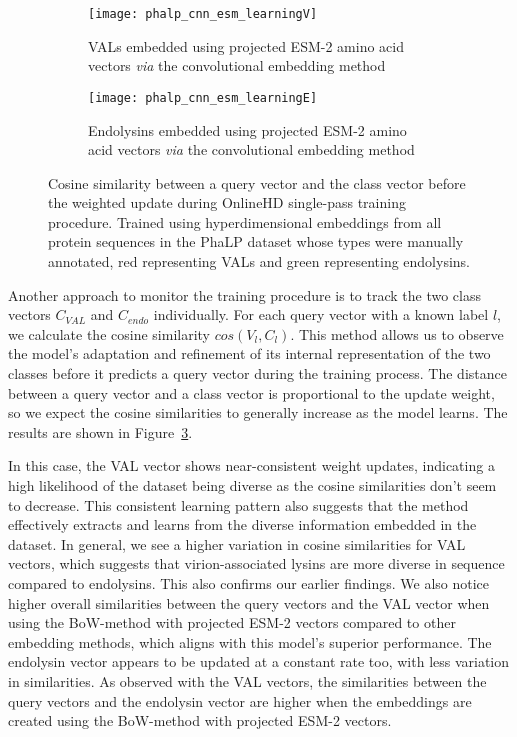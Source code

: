 \begin{figure}[ht!]
    \begin{subfigure}{0.48\textwidth}
        \texttt{[image: phalp\_cnn\_esm\_learningV]}
        \caption{VALs embedded using projected ESM-2 amino acid vectors \textit{via} the convolutional embedding method}
        \label{fig:subfig-g}
    \end{subfigure}
    \hfill
    \begin{subfigure}{0.48\textwidth}
        \texttt{[image: phalp\_cnn\_esm\_learningE]}
        \caption{Endolysins embedded using projected ESM-2 amino acid vectors \textit{via} the convolutional embedding method}
        \label{fig:subfig-h}
    \end{subfigure}
    
    \caption{Cosine similarity between a query vector and the class vector before the weighted update during OnlineHD single-pass training procedure. Trained using hyperdimensional embeddings from all protein sequences in the PhaLP dataset whose types were manually annotated, red representing VALs and green representing endolysins.}
    \label{fig:main}
\end{figure}

Another approach to monitor the training procedure is to track the two class vectors $C_{VAL}$ and $C_{endo}$ individually. For each query vector with a known label $l$, we calculate the cosine similarity $cos(V_{l}, C_{l})$. This method allows us to observe the model's adaptation and refinement of its internal representation of the two classes before it predicts a query vector during the training process. The distance between a query vector and a class vector is proportional to the update weight, so we expect the cosine similarities to generally increase as the model learns. The results are shown in Figure~\ref{fig:main}.

In this case, the VAL vector shows near-consistent weight updates, indicating a high likelihood of the dataset being diverse as the cosine similarities don't seem to decrease. This consistent learning pattern also suggests that the method effectively extracts and learns from the diverse information embedded in the dataset. In general, we see a higher variation in cosine similarities for VAL vectors, which suggests that virion-associated lysins are more diverse in sequence compared to endolysins. This also confirms our earlier findings. We also notice higher overall similarities between the query vectors and the VAL vector when using the BoW-method with projected ESM-2 vectors compared to other embedding methods, which aligns with this model's superior performance. The endolysin vector appears to be updated at a constant rate too, with less variation in similarities. As observed with the VAL vectors, the similarities between the query vectors and the endolysin vector are higher when the embeddings are created using the BoW-method with projected ESM-2 vectors.

